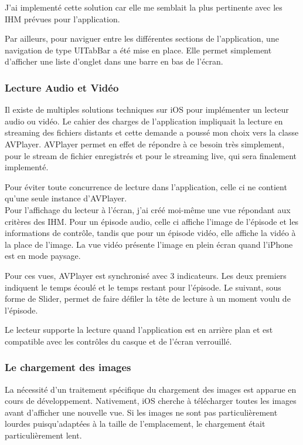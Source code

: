 \documentclass[11pt, french]{report}
\begin{document}
J'ai implementé cette solution car elle me semblait la plus pertinente avec les IHM prévues pour l'application.

Par ailleurs, pour naviguer entre les différentes sections de l'application, une navigation de type UITabBar a été mise en place. Elle permet simplement d'afficher une liste d'onglet dans une barre en bas de l'écran.

\subsubsection{Lecture Audio et Vidéo}

Il existe de multiples solutions techniques sur iOS pour implémenter un lecteur audio ou vidéo. Le cahier des charges de l'application impliquait la lecture en streaming des fichiers distants et cette demande a poussé mon choix vers la classe AVPlayer. AVPlayer permet en effet de répondre à ce besoin très simplement, pour le stream de fichier enregistrés et pour le streaming live, qui sera finalement implementé.

Pour éviter toute concurrence de lecture dans l'application, celle ci ne contient qu'une seule instance d'AVPlayer.\\

Pour l'affichage du lecteur à l'écran, j'ai créé moi-même une vue répondant aux critères des IHM. Pour un épisode audio, celle ci affiche l'image de l'épisode et les informations de contrôle, tandis que pour un épisode vidéo, elle affiche la vidéo à la place de l'image. La vue vidéo présente l'image en plein écran quand l'iPhone est en mode paysage.

Pour ces vues, AVPlayer est synchronisé avec 3 indicateurs. Les deux premiers indiquent le temps écoulé et le temps restant pour l'épisode. Le suivant, sous forme de Slider, permet de faire défiler la tête de lecture à un moment voulu de l'épisode.

Le lecteur supporte la lecture quand l'application est en arrière plan et est compatible avec les contrôles du casque et de l'écran verrouillé.

\subsubsection{Le chargement des images}

La nécessité d'un traitement spécifique du chargement des images est apparue en cours de développement. Nativement, iOS cherche à télécharger toutes les images avant d'afficher une nouvelle vue. Si les images ne sont pas particulièrement lourdes puisqu'adaptées à la taille de l'emplacement, le chargement était particulièrement lent.
\end{document}
